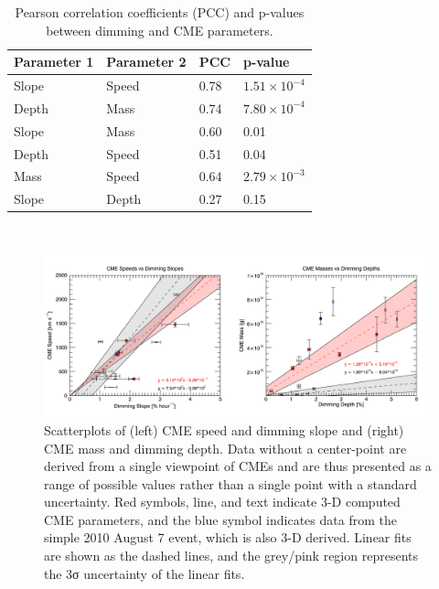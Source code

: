 \begin{table}[!h]
    \caption[Dimming-CME parameter correlations]{
        Pearson correlation coefficients (PCC) and p-values between dimming and CME parameters.
    }
    \begin{center}
    \begin{tabular}{|l|l|l|l|} \hline
	Parameter 1 & Parameter 2 & PCC & p-value \\ \hline \hline
	Slope & Speed & 0.78 & $1.51 \times 10^{-4}$ \\ \hline
	Depth & Mass & 0.74 & $7.80 \times 10^{-4}$ \\ \hline
	Slope & Mass & 0.60 & 0.01 \\ \hline
	Depth & Speed & 0.51 & 0.04 \\ \hline
	Mass & Speed & 0.64 & $2.79 \times 10^{-3}$ \\ \hline
	Slope & Depth & 0.27 & 0.15 \\ \hline
	\end{tabular}
    \\ \rule{0mm}{5mm}
    \end{center}
    \label{tab:correlations}
\end{table}

\begin{figure}[!h]
    \begin{center}
	    \includegraphics[width=\textwidth]{Images/Correlations.png}
    \end{center}
    \caption[Dimming-CME correlations]{
        Scatterplots of (left) CME speed and dimming slope and (right) CME mass and dimming depth. Data without a 
        center-point are derived from a single viewpoint of CMEs and are thus presented as a range of possible values 
        rather than a single point with a standard uncertainty. Red symbols, line, and text indicate 3-D computed CME 
        parameters, and the blue symbol indicates data from the simple 2010 August 7 event, which is also 3-D derived. 
        Linear fits are shown as the dashed lines, and the grey/pink region represents the 3σ uncertainty of the linear 
        fits.
   	}
    \label{fig:correlations}
\end{figure}

